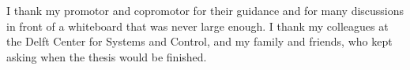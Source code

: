 I thank my promotor and copromotor for their guidance and for many discussions in front of a
whiteboard that was never large enough. I thank my colleagues at the Delft Center for Systems
and Control, and my family and friends, who kept asking when the thesis would be finished.
